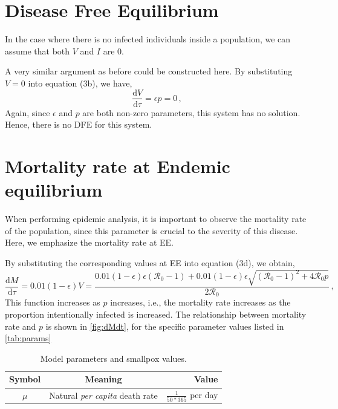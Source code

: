 \documentclass[12pt]{article}
\newcommand\dbyd[2]{\frac{\mathrm d{#1}}{\mathrm d{#2}}}
\newcommand{\R}{\mathcal{R}}
\begin{document}
\section{Disease Free Equilibrium}
In the case where there is no infected individuals inside a population, we can assume that both $V$ and $I$ are 0. 

A very similar argument as before could be constructed here.
By substituting $V=0$ into equation (3b), we have,
\begin{equation}
\dbyd{V}{\tau}=\epsilon p = 0\,,
\end{equation}
Again, since $\epsilon$ and $p$ are both non-zero parameters, this system has no solution. Hence, there is no DFE for this system.
\section{Mortality rate at Endemic equilibrium}
When performing epidemic analysis, it is important to observe the mortality rate of the population, since this parameter is crucial to the severity of this disease. Here, we emphasize the mortality rate at EE.

By substituting the corresponding values at EE into equation (3d), we obtain,
\begin{equation}
\dbyd{M}{\tau}=0.01(1-\epsilon)V=\frac{0.01(1-\epsilon)\epsilon(\R_0 -1)+ 0.01(1-\epsilon)\epsilon \sqrt{(\R_0-1)^2+4\R_0 p}}{2\R_0}\,,
\end{equation}
This function increases as $p$ increases, i.e., the mortality rate
increases as the proportion intentionally infected is increased.
The relationship between mortality rate and $p$ is shown in
\autoref{fig:dMdt}, for the specific parameter values listed in \autoref{tab:params}

\begin{table}
\begin{center}
\caption{Model parameters and smallpox values.}
\label{tab:params}
\smallskip
\begin{tabular}{c|c|r}
{\bfseries Symbol} & {\bfseries Meaning} & {\bfseries Value} \\\hline
$\mu$ & Natural \emph{per capita} death rate & $\frac{1}{50*365}$ per day \\
\end{tabular}
\end{center}
\end{table}
\end{document}
